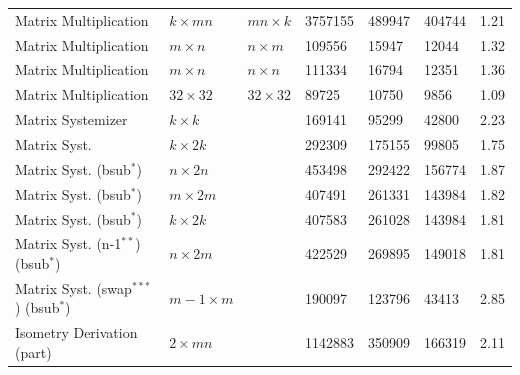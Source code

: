 \documentclass[11pt,a4paper]{report}
\theoremstyle{definition}
\begin{document}
\begin{table}
{\begin{tabular}{lllR{1.35cm}R{1.2cm}R{1.2cm}r}
      Matrix Multiplication                    & $k \times mn$                           & $mn \times k$                  & 3757155         & 489947         & 404744         & 1.21 \\
      Matrix Multiplication                    & $m \times n$                            & $n \times m$                   & 109556          & 15947          & 12044          & 1.32 \\
      Matrix Multiplication                    & $m \times n$                            & $n \times n$                   & 111334          & 16794          & 12351          & 1.36 \\
      Matrix Multiplication                    & $32 \times 32$                          & $32 \times 32$                 & 89725           & 10750          & 9856           & 1.09 \\
      \midrule
      Matrix Systemizer                        & $k \times k$                            &                                & 169141          & 95299          & 42800          & 2.23 \\
      Matrix Syst.                             & $k \times 2k$                           &                                & 292309          & 175155         & 99805          & 1.75 \\
      Matrix Syst. (bsub$^{*}$)                & $n \times 2n$                           &                                & 453498          & 292422         & 156774         & 1.87 \\
      Matrix Syst. (bsub$^{*}$)                & $m \times 2m$                           &                                & 407491          & 261331         & 143984         & 1.82 \\
      Matrix Syst. (bsub$^{*}$)                & $k \times 2k$                           &                                & 407583          & 261028         & 143984         & 1.81 \\
      Matrix Syst. (n-1$^{**}$) (bsub$^{*}$)   & $n \times 2m$                           &                                & 422529          & 269895         & 149018         & 1.81 \\
      Matrix Syst. (swap$^{***}$) (bsub$^{*}$) & $m-1 \times m$                          &                                & 190097          & 123796         & 43413          & 2.85 \\
      \midrule
      Isometry Derivation (part)               & $2 \times mn$                           &                                & 1142883         & 350909         & 166319         & 2.11 \\
      \bottomrule
    \end{tabular}
  }
  \label{tab:lowleveloptimizationresults}
\end{table}
\end{document}
